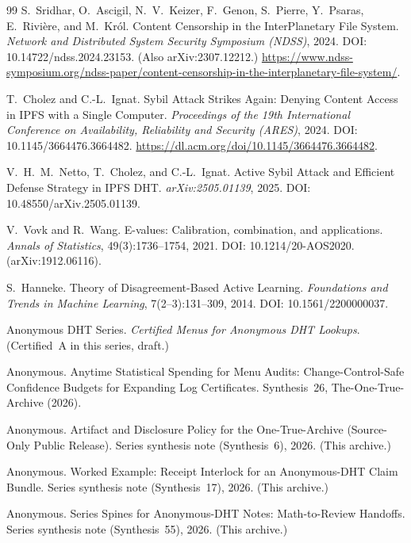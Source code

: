 \documentclass[11pt]{article}
\begin{document}
\begin{thebibliography}{99}
S.~Sridhar, O.~Ascigil, N.~V.~Keizer, F.~Genon, S.~Pierre, Y.~Psaras, E.~Rivi\`ere, and M.~Kr\'ol.
Content Censorship in the InterPlanetary File System.
\emph{Network and Distributed System Security Symposium (NDSS)}, 2024.
DOI: 10.14722/ndss.2024.23153. (Also arXiv:2307.12212.)
\url{https://www.ndss-symposium.org/ndss-paper/content-censorship-in-the-interplanetary-file-system/}.

T.~Cholez and C.-L.~Ignat.
Sybil Attack Strikes Again: Denying Content Access in IPFS with a Single Computer.
\emph{Proceedings of the 19th International Conference on Availability, Reliability and Security (ARES)}, 2024.
DOI: 10.1145/3664476.3664482.
\url{https://dl.acm.org/doi/10.1145/3664476.3664482}.

V.~H.~M.~Netto, T.~Cholez, and C.-L.~Ignat.
Active Sybil Attack and Efficient Defense Strategy in IPFS DHT.
\emph{arXiv:2505.01139}, 2025. DOI: 10.48550/arXiv.2505.01139.

V.~Vovk and R.~Wang.
E-values: Calibration, combination, and applications.
\emph{Annals of Statistics}, 49(3):1736--1754, 2021. DOI: 10.1214/20-AOS2020. (arXiv:1912.06116).

S.~Hanneke.
Theory of Disagreement-Based Active Learning.
\emph{Foundations and Trends in Machine Learning}, 7(2--3):131--309, 2014. DOI: 10.1561/2200000037.

Anonymous DHT Series.
\emph{Certified Menus for Anonymous DHT Lookups}.
(Certified~A in this series, draft.)

Anonymous.
\newblock Anytime Statistical Spending for Menu Audits: Change-Control-Safe Confidence Budgets for Expanding Log Certificates.
\newblock Synthesis~26, The-One-True-Archive (2026).



Anonymous.
\newblock Artifact and Disclosure Policy for the One-True-Archive (Source-Only Public Release).
\newblock Series synthesis note (Synthesis~6), 2026. (This archive.)

Anonymous.
\newblock Worked Example: Receipt Interlock for an Anonymous-DHT Claim Bundle.
\newblock Series synthesis note (Synthesis~17), 2026. (This archive.)

Anonymous.
\newblock Series Spines for Anonymous-DHT Notes: Math-to-Review Handoffs.
\newblock Series synthesis note (Synthesis~55), 2026. (This archive.)


\end{thebibliography}
\end{document}
